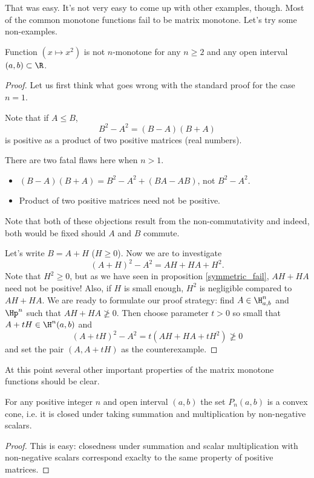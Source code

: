 That was easy. It's not very easy to come up with other examples, though. Most of the common monotone functions fail to be matrix monotone. Let's try some non-examples.

\begin{prop}
	Function $(x \mapsto x^2)$ is not $n$-monotone for any $n \geq 2$ and any open interval $(a, b) \subset \R$.
\end{prop}
\begin{proof}
	Let us first think what goes wrong with the standard proof for the case $n = 1$.

	Note that if $A \leq B$,
	\[
		B^2 - A^2 = (B - A) (B + A)
	\]
	is positive as a product of two positive matrices (real numbers).

	There are two fatal flaws here when $n > 1$.
	\begin{itemize}
		\item $(B - A) (B + A) = B^2-A^2 + (B A - A B)$, not $B^2 - A^2$.
		\item Product of two positive matrices need not be positive.
	\end{itemize}
	Note that both of these objections result from the non-commutativity and indeed, both would be fixed should $A$ and $B$ commute.

	Let's write $B = A + H$ ($H \geq 0$). Now we are to investigate
	\[
		(A + H)^2-A^2 = A H + H A + H^2.
	\]
	Note that $H^2 \geq 0$, but as we have seen in proposition \ref{symmetric_fail}, $A H + H A$ need not be positive! Also, if $H$ is small enough, $H^2$ is negligible compared to $AH + HA$. We are ready to formulate our proof strategy: find $A \in \H^{n}_{a, b}$ and $\Hp^{n}$ such that $A H + H A \ngeq 0$. Then choose parameter $t > 0$ so small that $A + t H \in \H^{n}(a,b)$ and
	\[
		(A + t H)^2 - A^2 = t (A H + H A + t H^2) \ngeq 0
	\]
	and set the pair $(A, A + t H)$ as the counterexample.
\end{proof}

At this point several other important properties of the matrix monotone functions should be clear.

\begin{prop}
	For any positive integer $n$ and open interval $(a, b)$ the set $P_{n}(a, b)$ is a convex cone, i.e. it is closed under taking summation and multiplication by non-negative scalars.
\end{prop}

\begin{proof}
	This is easy: closedness under summation and scalar multiplication with non-negative scalars correspond exaclty to the same property of positive matrices.
\end{proof}

